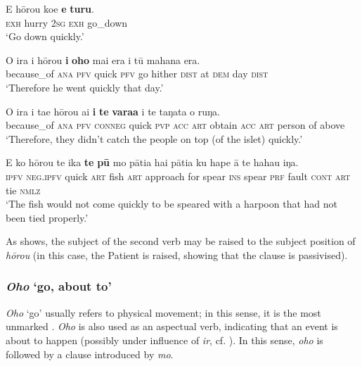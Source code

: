 \ea\label{ex:11.55}
\gll E hōrou koe \textbf{e} \textbf{turu}. \\
\textsc{exh} hurry \textsc{2sg} \textsc{exh} go\_down \\

\glt 
‘Go down quickly.’ \textstyleExampleref{[R231.143]} 
\z

\ea\label{ex:11.56}
\gll {\ꞌ}O ira i hōrou \textbf{i} \textbf{oho} mai era {\ꞌ}i tū mahana era. \\
because\_of \textsc{ana} \textsc{pfv} quick \textsc{pfv} go hither \textsc{dist} at \textsc{dem} day \textsc{dist} \\

\glt 
‘Therefore he went quickly that day.’ \textstyleExampleref{[R105.108]} 
\z

\ea\label{ex:11.57}
\gll {\ꞌ}O ira i ta{\ꞌ}e hōrou ai \textbf{i} \textbf{te} \textbf{vara{\ꞌ}a} i te taŋata o ruŋa. \\
because\_of \textsc{ana} \textsc{pfv} \textsc{conneg} quick \textsc{pvp} \textsc{acc} \textsc{art} obtain \textsc{acc} \textsc{art} person of above \\

\glt 
‘Therefore, they didn’t catch the people on top (of the islet) quickly.’ \textstyleExampleref{[R304.048]} 
\z

\ea\label{ex:11.58}
\gll E ko hōrou te ika \textbf{te} \textbf{pū} mo pātia hai pātia ku hape {\ꞌ}ā  te haha{\ꞌ}u iŋa.\\
\textsc{ipfv} \textsc{neg.ipfv} quick \textsc{art} fish \textsc{art} approach for spear \textsc{ins} spear \textsc{prf} fault \textsc{cont}  \textsc{art} tie \textsc{nmlz}\\

\glt
‘The fish would not come quickly to be speared with a harpoon that had not been tied properly.’ \textstyleExampleref{[R360.019]} 
\z

As  shows, the subject of the second verb may be raised to the subject position of \textit{hōrou} (in this case, the Patient is raised, showing that the  clause is passivised).

\subsubsection{\textit{Oho} ‘go, about to’}\label{sec:11.3.2.4}
\textit{Oho} ‘go’ usually refers to physical movement; in this sense, it is the most unmarked . \textit{Oho} is also used as an aspectual verb, indicating that an event is about to happen (possibly under influence of  \textit{ir}, cf. \citealt[392]{Fischer2007}). In this sense, \textit{oho} is followed by a  clause introduced by \textit{mo}.


